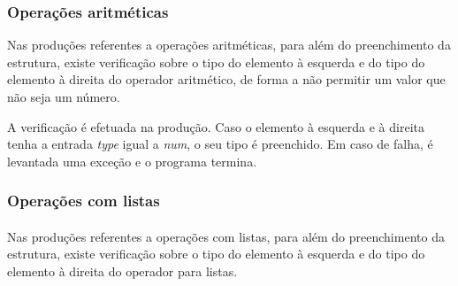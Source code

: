 \documentclass[11pt,a4paper]{report}
\begin{document}
\subsubsection{Operações aritméticas}

Nas produções referentes a operações aritméticas, para além do preenchimento da estrutura, existe verificação sobre o tipo do elemento à esquerda e do tipo do elemento à direita do operador aritmético, de forma a não permitir um valor que não seja um número.


A verificação é efetuada na produção. Caso o elemento à esquerda e à direita tenha a entrada \textit{type} igual a \textit{num}, o seu tipo é preenchido. Em caso de falha, é levantada uma exceção e o programa termina.

\subsubsection{Operações com listas}
\paragraph*{}
Nas produções referentes a operações com listas, para além do preenchimento da estrutura, existe verificação sobre o tipo do elemento à esquerda e do tipo do elemento à direita do operador para listas.
\end{document}
